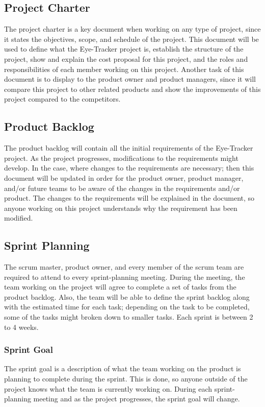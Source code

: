 \subsection{Project Charter}
The project charter is a key document when working on any type of project, since it states the objectives, scope, and schedule of the project. This document will be used to define what the Eye-Tracker project is, establish the structure of the project, show and explain the cost proposal for this project, and the roles and responsibilities of each member working on this project. Another task of this document is to display to the product owner and product managers, since it will compare this project to other related products and show the improvements of this project compared to the competitors.

\subsection{Product Backlog}
The product backlog will contain all the initial requirements of the Eye-Tracker project. As the project progresses, modifications to the requirements might develop. In the case, where changes to the requirements are necessary; then this document will be updated in order for the product owner, product manager, and/or future teams to be aware of the changes in the requirements and/or product. The changes to the requirements will be explained in the document, so anyone working on this project understands why the requirement has been modified. 

\subsection{Sprint Planning}
The scrum master, product owner, and every member of the scrum team are required to attend to every sprint-planning meeting. During the meeting, the team working on the project will agree to complete a set of tasks from the product backlog. Also, the team will be able to define the sprint backlog along with the estimated time for each task; depending on the task to be completed, some of the tasks might broken down to smaller tasks. Each sprint is between 2 to 4 weeks.

\subsubsection{Sprint Goal}
The sprint goal is a description of what the team working on the product is planning to complete during the sprint. This is done, so anyone outside of the project knows what the team is currently working on. During each sprint-planning meeting and as the project progresses, the sprint goal will change.

